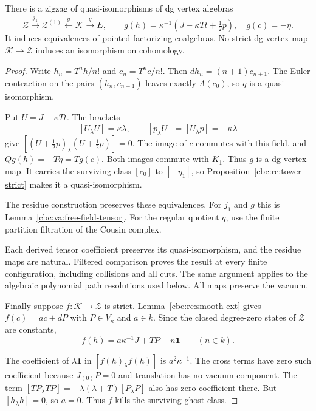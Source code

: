 \begin{proposition}\label{cbc:rc:constant-cochains}
There is a zigzag of quasi-isomorphisms of dg vertex algebras
\[
 \mathcal Z\xrightarrow{j_1}\mathcal Z^{(1)}
 \xleftarrow{g}\mathcal K\xrightarrow{q}E,
 \qquad
 g(h)=\kappa^{-1}(J-\kappa Tt+\tfrac12p),\quad g(c)=-\eta.
\]
It induces equivalences of pointed factorizing coalgebras.
No strict dg vertex map $\mathcal K\to\mathcal Z$ induces
an isomorphism on cohomology.
\end{proposition}
\begin{proof}
Write $h_n=T^nh/n!$ and $c_n=T^nc/n!$.
Then $dh_n=(n+1)c_{n+1}$. The Euler contraction on the
pairs $(h_n,c_{n+1})$ leaves exactly $\Lambda(c_0)$,
so $q$ is a quasi-isomorphism.

Put $U=J-\kappa Tt$. The brackets
\[
 [U_\lambda U]=\kappa\lambda,
 \qquad [p_\lambda U]=[U_\lambda p]=-\kappa\lambda
\]
give $[(U+\tfrac12p)_\lambda(U+\tfrac12p)]=0$.
The image of $c$ commutes with this field, and
$Qg(h)=-T\eta=Tg(c)$. Both images commute with $K_1$.
Thus $g$ is a dg vertex map. It carries the surviving
class $[c_0]$ to $[-\eta_1]$, so
Proposition~\ref{cbc:rc:tower-strict} makes it a
quasi-isomorphism.

The residue construction preserves these equivalences.
For $j_1$ and $g$ this is
Lemma~\ref{cbc:va:free-field-tensor}. For the regular
quotient $q$, use the finite partition filtration of
the Cousin complex.

Each derived tensor coefficient
preserves its quasi-isomorphism, and the residue maps
are natural. Filtered comparison proves the result at
every finite configuration, including collisions and
all cuts. The same argument applies to the algebraic
polynomial path resolutions used below. All maps
preserve the vacuum.

Finally suppose $f:\mathcal K\to\mathcal Z$ is strict.
Lemma~\ref{cbc:rc:smooth-ext} gives
$f(c)=ac+dP$ with $P\in V_\kappa$ and $a\in k$.
Since the closed degree-zero states of $\mathcal Z$
are constants,
\[
 f(h)=a\kappa^{-1}J+TP+n\mathbf1\qquad(n\in k).
\]

The coefficient of $\lambda\mathbf1$ in
$[f(h)_\lambda f(h)]$ is $a^2\kappa^{-1}$.
The cross terms have zero such coefficient because
$J_{(0)}P=0$ and translation has no vacuum component.
The term $[TP_\lambda TP]=-\lambda(\lambda+T)[P_\lambda P]$
also has zero coefficient there. But $[h_\lambda h]=0$,
so $a=0$. Thus $f$ kills the surviving ghost class.
\end{proof}

